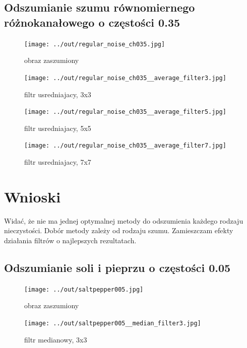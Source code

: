 \documentclass[a4paper,12pt]{article}
\begin{document}
\newpage
\subsection{Odszumianie szumu równomiernego różnokanałowego o częstości 0.35}
\begin{figure}[h!]
\begin{minipage}[t]{7.5cm}
\begin{center}
\texttt{[image: ../out/regular\_noise\_ch035.jpg]}
\caption{obraz zaszumiony}
\end{center}
\end{minipage}
\hfill
\begin{minipage}[t]{7.5cm}
\begin{center}
\texttt{[image: ../out/regular\_noise\_ch035\_\_average\_filter3.jpg]}
\caption{filtr usredniajacy, 3x3}
\end{center}
\end{minipage}
\end{figure}

\begin{figure}[h!]
\begin{minipage}[t]{7.5cm}
\begin{center}
\texttt{[image: ../out/regular\_noise\_ch035\_\_average\_filter5.jpg]}
\caption{filtr usredniajacy, 5x5}
\end{center}
\end{minipage}
\hfill
\begin{minipage}[t]{7.5cm}
\begin{center}
\texttt{[image: ../out/regular\_noise\_ch035\_\_average\_filter7.jpg]}
\caption{filtr usredniajacy, 7x7}
\end{center}
\end{minipage}
\end{figure}



\section{Wnioski}
Widać, że nie ma jednej optymalnej metody do odszumienia każdego rodzaju nieczystości. Dobór metody zależy od rodzaju szumu. Zamieszczam efekty działania filtrów o najlepszych rezultatach.


\newpage
\subsection{Odszumianie soli i pieprzu o częstości 0.05}
\begin{figure}[h!]
\begin{minipage}[t]{7.5cm}
\begin{center}
\texttt{[image: ../out/saltpepper005.jpg]}
\caption{obraz zaszumiony}
\end{center}
\end{minipage}
\hfill
\begin{minipage}[t]{7.5cm}
\begin{center}
\texttt{[image: ../out/saltpepper005\_\_median\_filter3.jpg]}
\caption{filtr medianowy, 3x3}
\end{center}
\end{minipage}
\end{figure}
\end{document}
